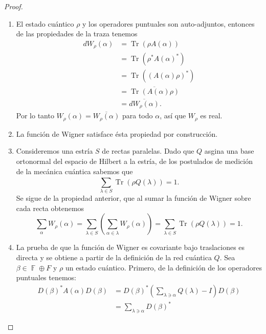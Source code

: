 \documentclass[a4paper,11pt]{report}
\DeclareMathOperator{\F}{\mathbb{F}}
\DeclareMathOperator{\Tr}{Tr}
\begin{document}
  \begin{proof}
    ${}$ 
    \begin{enumerate}
      \item El estado cuántico $\rho$ y los operadores
        puntuales son auto-adjuntos, entonces de las
        propiedades de la traza tenemos
        \begin{align}
          d W_\rho(\alpha)
          &= \Tr(\rho A(\alpha)) \\
          &= \Tr\left(\rho^{*} A(\alpha)^{*}\right) \\
          &= \Tr\left( (A(\alpha)\rho)^{*} \right) \\
          &= \overline{\Tr\left( A(\alpha)\rho \right)} \\
          &= \overline{d W_\rho(\alpha)}.
        \end{align}
        Por lo tanto $W_\rho(\alpha) =
        \overline{W_\rho(\alpha)}$ para todo $\alpha$, así
        que $W_\rho$ es real.
      \item La función de Wigner satisface ésta propiedad
        por construcción.
      \item Consideremos una estría $S$ de rectas paralelas.
        Dado que $Q$ asgina una base ortonormal del espacio
        de Hilbert a la estría, de los postulados de
        medición de la mecánica cuántica sabemos que
        \[
          \sum_{\lambda \in S}^{}
          \Tr\left( \rho Q(\lambda) \right)
          = 1.
        \] 
        Se sigue de la propiedad anterior, que al sumar la
        función de Wigner sobre cada recta obtenemos
        \begin{equation}
          \sum_{\alpha}^{} W_\rho(\alpha)
          = \sum_{\lambda \in S}^{} \left( 
            \sum_{\alpha \in \lambda}^{} W_\rho(\alpha)
          \right) 
          = \sum_{\lambda \in S}^{} \Tr(\rho Q(\lambda))
          = 1.
        \end{equation}
      \item La prueba de que la función de Wigner es
        covariante bajo traslaciones es directa y se obtiene
        a partir de la definición de la red cuántica $Q$.
        Sea $\beta \in \F \oplus F$ y $\rho$ un estado
        cuántico. Primero, de la definición de los
        operadores puntuales tenemos:
        \begin{align}
          D(\beta)^{*} A(\alpha) D(\beta)
          &= D(\beta)^{*} \left( \sum_{\lambda \ni
          \alpha}^{} Q(\lambda) - I \right) D(\beta) \\
          &= \sum_{\lambda \ni \alpha}^{} D(\beta)^{*}

\end{align}
\end{enumerate}
\end{proof}
\end{document}
